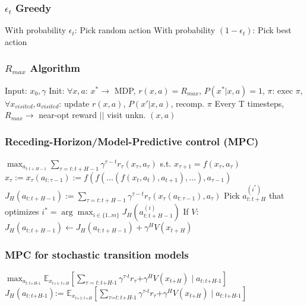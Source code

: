 \documentclass[a4paper, 11pt, landscape]{article}
\begin{document}
\begin{multicols*}{3}
\subsubsection{$\epsilon_t$ Greedy}
With probability $\epsilon_t$: Pick random action
\newline With probability $(1-\epsilon_t)$: Pick best action

\subsubsection{$R_{max}$ Algorithm}
Input: $x_0, \gamma$
\newline Init: $\forall x,a$: $x^*\to$ MDP, $r(x, a) = R_{max}$, $P(x^* | x, a) = 1$, $\pi$:
\newline exec $\pi$, $\forall x_{visited},a_{visited}$: update $r(x, a)$, $P(x' | x, a)$, recomp. $\pi$
\newline Every T timesteps, $R_{max}\to$ near-opt reward $||$ visit unkn. $(x,a)$

\subsubsection{Receding-Horizon/Model-Predictive control (MPC)}
$\max _{a_{t: t+H-1}} \sum_{\tau=t: t+H-1} \gamma^{\tau-t} r_{\tau}\left(x_{\tau}, a_{\tau}\right)$ s.t. $x_{\tau+1}=f\left(x_{\tau}, a_{\tau}\right)$
\newline $x_{\tau}:=x_{\tau}\left(a_{t: \tau-1}\right):=f\left(f\left(\ldots\left(f\left(x_{t}, a_{t}\right), a_{t+1}\right), \ldots\right), a_{\tau-1}\right)$
\newline $J_{H}\left(a_{t: t+H-1}\right):=\sum_{\tau=t: t+H-1} \gamma^{\tau-t} r_{\tau}\left(x_{\tau}\left(a_{t: \tau-1}\right), a_{\tau}\right)$
\newline Pick $a_{t:t+H}^{(i^*)}$ that optimizes $i^{*}=\arg \max _{i \in\{1 . . m\}} J_{H}\left(a_{t: t+H-1}^{(i)}\right)$
\newline If $V$: $J_{H}\left(a_{t: t+H-1}\right)\leftarrow J_{H}\left(a_{t: t+H-1}\right)+\gamma^{H} V\left(x_{t+H}\right)$

\subsubsection{MPC for stochastic transition models}
$\max _{a_{t: t\text{+}H\text{-}1}} \mathbb{E}_{x_{t\text{+}1: t\text{+}H}}\left[\sum_{\tau=t: t\text{+}H\text{-}1} \gamma^{\tau\text{-}t} r_{\tau}\text{+}\gamma^{H} V\left(x_{t\text{+}H}\right) \mid a_{t: t\text{+}H\text{-}1}\right]$
\newline $J_{H}\left(a_{t: t\text{+}H\text{-}1}\right)\text{:= }\mathbb{E}_{x_{t\text{+}1: t\text{+}H}}\left[\sum_{\tau\text{=}t: t\text{+}H\text{-}1} \gamma^{\tau\text{-}t} r_{\tau}\text{+}\gamma^{H} V\left(x_{t\text{+}H}\right) \mid a_{t: t\text{+}H\text{-}1}\right]$


\end{multicols*}
\end{document}
